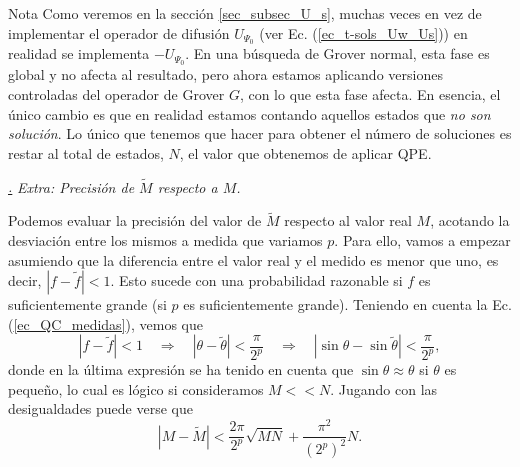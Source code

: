 \documentclass[a4paper,11pt]{book} %
\numberwithin{equation}{chapter}
\def\rqa{\quad \Rightarrow \quad}
\def\subsubiContadorIt{\par\addtocounter{subsubsection}{1}\underline{\it\thesubsubsection.}\hskip0.5cm \setcounter{subsubsubsectionIt}{0}}
\newcommand{\SubsubiIt}[1]{
		\subsubiContadorIt \textit{#1}
	}
\newcounter{subsubsubsectionIt}[subsubsection]
\begin{document}
	\begin{mybox_blue}{Nota}
	Como veremos en la sección \ref{sec_subsec_U_s}, muchas veces en vez de implementar el operador de 
	difusión $U_{\Psi_0}$ (ver Ec. (\ref{ec_t-sols_Uw_Us})) en realidad se implementa $-U_{\Psi_0}$. 
	En una búsqueda de Grover normal, esta fase es global 
	y no afecta al resultado, pero ahora estamos aplicando versiones controladas del operador de Grover 
	$G$, con lo que esta fase afecta. En esencia, el único cambio es que en realidad estamos contando 
	aquellos estados que \textit{no son solución}. Lo único que tenemos que hacer para obtener el número 
	de soluciones es restar al total de estados, $N$, el valor que obtenemos de aplicar QPE. 
	\end{mybox_blue}

\SubsubiIt{Extra: Precisión de $\tilde{M}$ respecto a $M$.}

Podemos evaluar la precisión del valor de $\tilde{M}$ respecto al valor real $M$, acotando la desviación entre los mismos a medida que variamos $p$. Para ello, vamos a empezar asumiendo que la diferencia entre el valor real y el medido es menor que uno, es decir, $| f- \tilde{f}| <1$. Esto sucede con una probabilidad razonable si $f$ es suficientemente grande (si $p$ es suficientemente grande). Teniendo en cuenta la Ec. (\ref{ec_QC_medidas}), vemos que
\begin{equation*}
| f- \tilde{f}| < 1 \rqa | \theta - \tilde{\theta}| < \frac{\pi}{2^p} \rqa | \sin \theta - \sin \tilde{\theta}| < \frac{\pi}{2^p},
\end{equation*}
donde en la última expresión se ha tenido en cuenta que $\sin \theta \approx \theta$ si $\theta$ es pequeño, lo cual es lógico si consideramos $M << N$. Jugando con las desigualdades puede verse que
\begin{equation} \label{ec_QC_error}
\boxed{|M - \tilde{M}| <   \frac{2 \pi}{2^p} \sqrt{M N} + \frac{\pi^2}{(2^p)^2} N}.
\end{equation}
\end{document}
